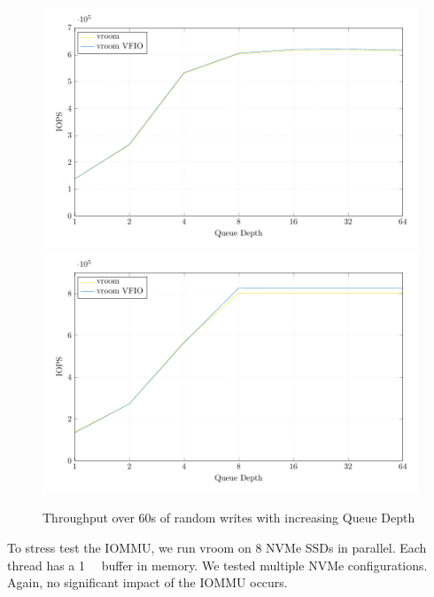 \begin{figure}[H]
  \centering
   {\includegraphics[width=.8\textwidth]{figures/qdnt1_2MiB} \label{fig:qdnt1-2MiB-intel}}
   {\includegraphics[width=.8\textwidth]{figures/qdnt1_2MiB_epyc} \label{fig:qdnt1-2MiB-epyc}}
  \caption{Throughput over 60s of random writes with increasing Queue Depth}
  \label{fig:qdnt1-2MiB}
\end{figure}

To stress test the IOMMU, we run vroom on 8 NVMe SSDs in parallel. Each thread has a \qty{1}{\gibi\byte} buffer in memory. We tested multiple NVMe configurations. Again, no significant impact of the IOMMU occurs.

